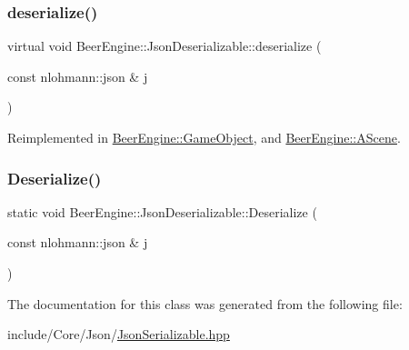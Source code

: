 \subsubsection{\texorpdfstring{deserialize()}{deserialize()}}
{\footnotesize\ttfamily virtual void Beer\+Engine\+::\+Json\+Deserializable\+::deserialize (\begin{DoxyParamCaption}\item[{const nlohmann\+::json \&}]{j }\end{DoxyParamCaption})\hspace{0.3cm}{\ttfamily [virtual]}}



Reimplemented in \mbox{\hyperlink{class_beer_engine_1_1_game_object_a68a7f2c23d06d575e683705195821c87}{Beer\+Engine\+::\+Game\+Object}}, and \mbox{\hyperlink{class_beer_engine_1_1_a_scene_a3db491adb7ff57a3a527024fd0a6001f}{Beer\+Engine\+::\+A\+Scene}}.

\mbox{\label{class_beer_engine_1_1_json_deserializable_af4c5582f75eb96988c5d4ff546218e1e}} 
\subsubsection{\texorpdfstring{Deserialize()}{Deserialize()}}
{\footnotesize\ttfamily static void Beer\+Engine\+::\+Json\+Deserializable\+::\+Deserialize (\begin{DoxyParamCaption}\item[{const nlohmann\+::json \&}]{j }\end{DoxyParamCaption})\hspace{0.3cm}{\ttfamily [static]}}



The documentation for this class was generated from the following file\+:\begin{DoxyCompactItemize}
\item 
include/\+Core/\+Json/\mbox{\hyperlink{_json_serializable_8hpp}{Json\+Serializable.\+hpp}}\end{DoxyCompactItemize}
